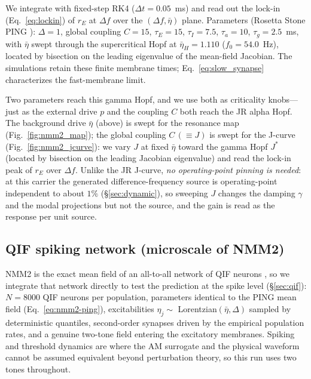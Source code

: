 \documentclass[11pt,a4paper]{article}
\begin{document}
We integrate with fixed-step RK4 ($\Delta t=0.05$~ms) and read out the lock-in
(Eq.~\eqref{eq:lockin}) of $r_E$ at $\Delta f$ over the $(\Delta f, \bar\eta)$ plane.
Parameters (Rosetta Stone PING \cite{ruffini2025rosetta}): $\Delta=1$, global coupling
$C=15$, $\tau_E=15$, $\tau_I=7.5$, $\tau_a=10$, $\tau_g=2.5$~ms, with $\bar\eta$ swept
through the supercritical Hopf at $\bar\eta_H=1.110$ ($f_0=54.0$~Hz), located by bisection
on the leading eigenvalue of the mean-field Jacobian. The simulations retain these
finite membrane times; Eq.~\eqref{eq:slow_synapse} characterizes the fast-membrane limit.

Two parameters reach this gamma Hopf, and we use both as criticality knobs---just as the
external drive $p$ and the coupling $C$ both reach the JR alpha Hopf. The background drive
$\bar\eta$ (above) is swept for the resonance map (Fig.~\ref{fig:nmm2_map}); the global
coupling $C\,(\equiv J)$ is swept for the J-curve (Fig.~\ref{fig:nmm2_jcurve}): we vary
$J$ at fixed $\bar\eta$ toward the gamma Hopf $J^*$ (located by bisection on the leading
Jacobian eigenvalue) and read the lock-in peak of $r_E$ over $\Delta f$. Unlike the JR
J-curve, \emph{no operating-point pinning is needed}: at this carrier the generated
difference-frequency source is operating-point independent to about $1\%$
(\S\ref{sec:dynamic}), so sweeping $J$ changes the damping $\gamma$ and the modal
projections but not the source, and the gain is read as the response per unit source.

\subsection{QIF spiking network (microscale of NMM2)}\label{sec:qif-methods}
NMM2 is the exact mean field of an all-to-all network of QIF neurons
\cite{montbrio2015,ruffini2025rosetta,clusella2023}, so we integrate that network directly
to test the prediction at the spike level (\S\ref{sec:qif}): $N=8000$ QIF neurons per
population, parameters identical to the PING mean field (Eq.~\eqref{eq:nmm2-ping}),
excitabilities $\eta_j\sim$ Lorentzian$(\bar\eta,\Delta)$ sampled by deterministic
quantiles, second-order synapses driven by the empirical population rates, and a genuine
two-tone field entering the excitatory membranes. Spiking and threshold dynamics are
where the AM surrogate and the physical waveform cannot be assumed equivalent beyond
perturbation theory, so this run uses two tones throughout.
\end{document}
